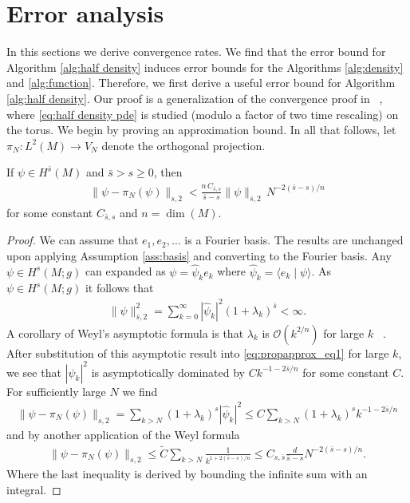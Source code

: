 \documentclass[final,leqno]{siamart}
\begin{document}
\section{Error analysis} \label{sec:analysis}

In this sections we derive convergence rates.
We find that the error bound for Algorithm \ref{alg:half density} induces error bounds for the Algorithms \ref{alg:density} and \ref{alg:function}.
Therefore, we first derive a useful error bound for Algorithm \ref{alg:half density}.
Our proof is a generalization of the convergence proof in ~\cite{Pasciak1980}, where \eqref{eq:half density pde} is studied (modulo a factor of two time rescaling) on the torus.
We begin by proving an approximation bound.
In all that follows, let $\pi_{N}: L^{2}(M) \to V_{N}$ denote the orthogonal projection.

\begin{proposition} \label{prop:approximation}
	If $\psi \in H^{\bar{s}}(M)$ and $\bar{s} > s \geq 0$,
	then
	\begin{align*}
		\| \psi - \pi_{N}(\psi) \|_{s,2} <  \frac{n \, C_{\bar{s},s} }{ \bar{s}-s} \| \psi \|_{\bar{s} , 2} \, N^{-2(\bar{s}-s)/n}
	\end{align*}
	for some constant $C_{\bar{s},s}$ and $n = \dim(M)$.
\end{proposition}
\begin{proof}
	We can assume that $e_{1},e_{2},\dots$ is a Fourier basis.
	The results are unchanged upon applying Assumption \ref{ass:basis} and converting to the Fourier basis.
	Any $\psi \in H^{s}(M;g)$ can expanded as $\psi = \hat{\psi}_{k} e_{k}$ where $\hat{\psi}_{k} = \langle e_{k} \mid \psi \rangle$.
	As $\psi \in H^{s}(M;g)$ it follows that
	\begin{align}
		\| \psi \|^{2}_{\bar{s},2} = \sum_{k=0}^{\infty} \left| \hat{\psi}_{k} \right|^{2} (1+\lambda_{k})^{\bar{s}} < \infty.
		\label{eq:propapprox_eq1}
	\end{align}
	A corollary of Weyl's asymptotic formula is that $\lambda_{k}$ is $\mathcal{O}( k^{2/n})$ for large $k$ ~\cite[page 155]{Chavel1984}.
	After substitution of this asymptotic result into \eqref{eq:propapprox_eq1} for large $k$, we see that $|\hat{\psi}_{k}|^{2}$ is asymptotically dominated by  $C k^{-1- 2\bar{s}/n}$ for some constant $C$.
	For sufficiently large $N$ we find
	\begin{align*}
		\| \psi - \pi_{N}(\psi) \|_{s,2} = \sum_{k>N} (1+\lambda_{k})^{s} |\hat{\psi}_{k}|^{2} \leq C \sum_{k>N} (1+\lambda_{k})^{s} k^{-1- 2\bar{s}/n}
	\end{align*}
	and by another application of the Weyl formula
	\begin{align*}
		\| \psi - \pi_{N}(\psi) \|_{s,2} \leq \tilde{C} \sum_{k>N} \frac{1}{k^{1+2(\bar{s}-s)/n}} \leq C_{s,\bar{s}}  \frac{d }{ \bar{s}-s} N^{-2(\bar{s}-s)/n}.
	\end{align*}
	Where the last inequality is derived by bounding the infinite sum with an integral.
\end{proof}
\end{document}
